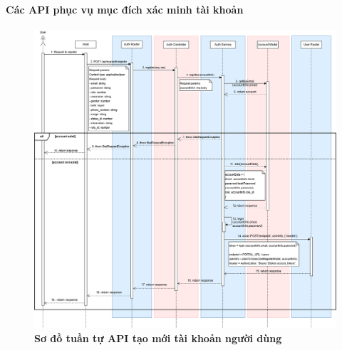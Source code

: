 \paragraph{Các API phục vụ mục đích xác minh tài khoản}
\mbox{}

\begin{figure}[H]
	\centering
	\includegraphics[width=16cm]{Images/api_sequence/authen/authentication-register.drawio.png}
	\caption[Sơ đồ tuần tự API tạo mới tài khoản người dùng]{\bfseries \fontsize{12pt}{0pt}\selectfont Sơ đồ tuần tự API tạo mới tài khoản người dùng}
	\label{sequence_diagram_create_account}
\end{figure}

